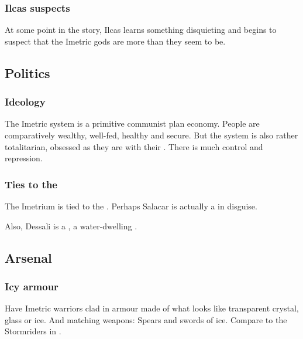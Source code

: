 \subsubsection{Ilcas suspects}
At some point in the story, Ilcas learns something disquieting and begins to suspect that the Imetric gods are more than they seem to be. 









\subsection{Politics}
\subsubsection{Ideology}
The Imetric system is a primitive communist plan economy. 
People are comparatively wealthy, well-fed, healthy and secure. 
But the system is also rather totalitarian, obsessed as they are with their . 
There is much control and repression. 





\subsubsection{Ties to the \nagae}
\label{Imetrians and \nagae}
The Imetrium is tied to the \nagae. 
Perhaps Salacar is actually a \vlekkeshsal{} in disguise. 

Also, Dessali is a \naiad, a water-dwelling . 









\subsection{Arsenal}
\subsubsection{Icy armour}
Have Imetric warriors clad in armour made of what looks like transparent crystal, glass or ice. 
And matching weapons: Spears and swords of ice. 
Compare to the Stormriders in . 















